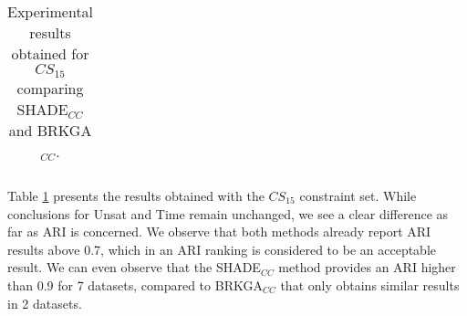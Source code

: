 \begin{table}[!h]
{\begin{tabular}{l ccc c ccc}
	\end{tabular}}
	
	\caption[Experimental results obtained for $CS_{15}$ comparing SHADE$_{CC}$ and BRKGA$_{CC}$.]{Experimental results obtained for $CS_{15}$ comparing \acs{SHADE}$_{CC}$ and \acs{BRKGA}$_{CC}$.}
	\label{tab:resultsBRKGAvsSHADE15}
\end{table}

Table \ref{tab:resultsBRKGAvsSHADE15} presents the results obtained with the $CS_{15}$ constraint set. While conclusions for Unsat and Time remain unchanged, we see a clear difference as far as \acs{ARI} is concerned. We observe that both methods already report \acs{ARI} results above 0.7, which in an \acs{ARI} ranking is considered to be an acceptable result. We can even observe that the \acs{SHADE}$_{CC}$ method provides an \acs{ARI} higher than 0.9 for 7 datasets, compared to \acs{BRKGA}$_{CC}$ that only obtains similar results in 2 datasets.

